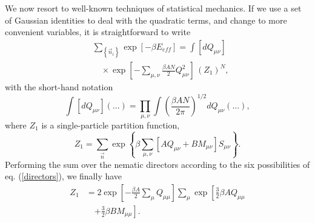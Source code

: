 \documentclass[aps,pre,reprint,amsmath,amssymbols,superscriptaddress,
nofootinbib]{revtex4-1}
\begin{document}
We now resort to well-known techniques of statistical mechanics. If we use a
set of Gaussian identities to deal with the quadratic terms, and change to
more convenient variables, it is straightforward to write%
\begin{align}
& \sum_{\left\{  \overrightarrow{n}_{i}\right\}  }\exp\left[  -\beta
E_{eff}\right] =\int\left[  dQ_{\mu\nu}\right] 
\nonumber \\ & \quad \times
\exp\left[  -\sum_{\mu,\nu
}\frac{\beta AN}{2}Q_{\mu\nu}^{2}\right]  \,\left(  Z_{1}\right)  ^{N},
\end{align}
with the short-hand notation%
\begin{equation}
\int\left[  dQ_{\mu\nu}\right]  \left(  ...\right)  =%
{\displaystyle\prod\limits_{\mu,\nu}}
\int\left(  \frac{\beta AN}{2\pi}\right)  ^{1/2}dQ_{\mu\nu}\left(  ...\right)
,
\end{equation}
where $Z_{1}$ is a single-particle partition function,%
\begin{equation}
Z_{1}=\sum_{\overrightarrow{n}}\exp\left\{  \beta\sum_{\mu,\nu}\left[
AQ_{\mu\nu}+BM_{\mu\nu}\right]  S_{\mu\nu}\right\}  .
\end{equation}
Performing the sum over the nematic directors according to the six
possibilities of eq. (\ref{directors}), we finally have%
\begin{align}
Z_{1} &=2\exp\left[  -\frac{\beta A}{2}\sum_{\mu}Q_{\mu\mu}\right]  \sum_{\mu
}\exp\left[  \frac{3}{2}\beta AQ_{\mu\mu}
\right. \nonumber \\ & \quad \left.
+\frac{3}{2}\beta BM_{\mu\mu}\right].
\end{align}
\end{document}
